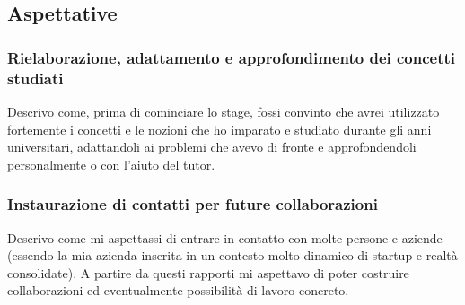 		\subsection{Aspettative}
			\subsubsection{Rielaborazione, adattamento e approfondimento dei concetti studiati}
				Descrivo come, prima di cominciare lo stage, fossi convinto che avrei utilizzato fortemente i concetti e le nozioni
				che ho imparato e studiato durante gli anni universitari, adattandoli ai problemi che avevo di fronte e
				approfondendoli personalmente o con l'aiuto del tutor.
			\subsubsection{Instaurazione di contatti per future collaborazioni}
				Descrivo come mi aspettassi di entrare in contatto con molte persone e aziende (essendo la mia azienda inserita in
				un contesto molto dinamico di startup e realtà consolidate). A partire da questi rapporti mi aspettavo di poter
				costruire collaborazioni ed eventualmente possibilità di lavoro concreto.
